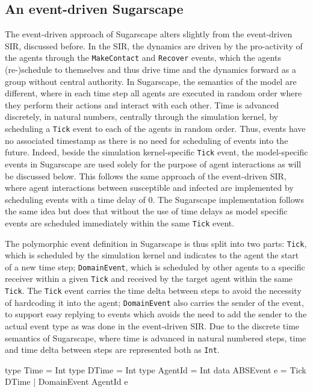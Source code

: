 \subsection{An event-driven Sugarscape}
The event-driven approach of Sugarscape alters slightly from the event-driven SIR, discussed before. In the SIR, the dynamics are driven by the pro-activity of the agents through the \texttt{MakeContact} and \texttt{Recover} events, which the agents (re-)schedule to themselves and thus drive time and the dynamics forward as a group without central authority. In Sugarscape, the semantics of the model are different, where in each time step all agents are executed in random order where they perform their actions and interact with each other. Time is advanced discretely, in natural numbers, centrally through the simulation kernel, by scheduling a \texttt{Tick} event to each of the agents in random order. Thus, events have no associated timestamp as there is no need for scheduling of events into the future. Indeed, beside the simulation kernel-specific \texttt{Tick} event, the model-specific events in Sugarscape are used solely for the purpose of agent interactions as will be discussed below. This follows the same approach of the event-driven SIR, where agent interactions between susceptible and infected are implemented by scheduling events with a time delay of 0. The Sugarscape implementation follows the same idea but does that without the use of time delays as model specific events are scheduled immediately within the same \texttt{Tick} event.

The polymorphic event definition in Sugarscape is thus split into two parts: \texttt{Tick}, which is scheduled by the simulation kernel and indicates to the agent the start of a new time step; \texttt{DomainEvent}, which is scheduled by other agents to a specific receiver within a given \texttt{Tick} and received by the target agent within the same \texttt{Tick}. The \texttt{Tick} event carries the time delta between steps to avoid the necessity of hardcoding it into the agent; \texttt{DomainEvent} also carries the sender of the event, to support easy replying to events which avoids the need to add the sender to the actual event type as was done in the event-driven SIR. Due to the discrete time semantics of Sugarscape, where time is advanced in natural numbered steps, time and time delta between steps are represented both as \texttt{Int}.

\begin{HaskellCode}
type Time       = Int
type DTime      = Int
type AgentId    = Int
data ABSEvent e = Tick DTime 
                | DomainEvent AgentId e
\end{HaskellCode}

